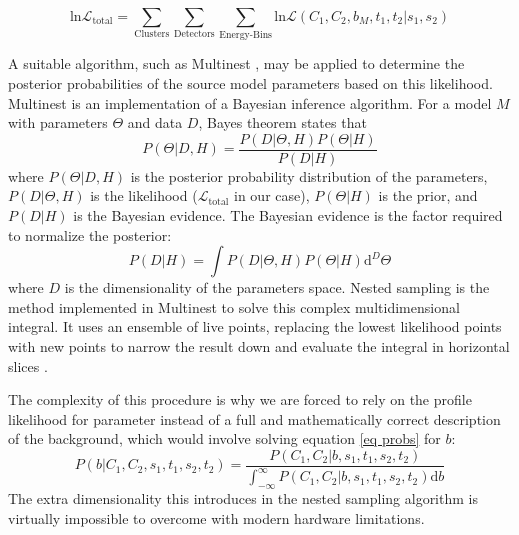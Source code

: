 \documentclass{report}
\begin{document}
\begin{equation} \label{total log likelihood}
  \text{ln}\mathcal{L}_{\text{total}} = \sum_{\text{Clusters}}\sum_{\text{Detectors}}\sum_{\text{Energy-Bins}} \text{ln}\mathcal{L}(C_1, C_2, b_M, t_1, t_2 \vert s_1, s_2)
\end{equation}

A suitable algorithm, such as Multinest \cite{Feroz_2019}, may be applied to determine the posterior probabilities of the source model parameters based on this likelihood.
Multinest is an implementation of a Bayesian inference algorithm. For a model $M$ with parameters $\Theta$ and data $D$, Bayes theorem states that
\begin{equation}
  P(\Theta\vert D, H) = \frac{P(D\vert \Theta, H)P(\Theta\vert H)}{P(D\vert H)}
\end{equation}
where $P(\Theta\vert D, H)$ is the posterior probability distribution of the parameters, $P(D\vert \Theta, H)$ is the likelihood ($\mathcal{L}_{\text{total}}$ in our case), $P(\Theta\vert H)$ is the prior, and $P(D\vert H)$ is the Bayesian evidence. The Bayesian evidence is the factor required to normalize the posterior:
\begin{equation}
  P(D\vert H) = \int P(D\vert \Theta, H) P(\Theta\vert H) \text{d}^D \Theta
\end{equation}
where $D$ is the dimensionality of the parameters space. Nested sampling is the method implemented in Multinest to solve this complex multidimensional integral. It uses an ensemble of live points, replacing the lowest likelihood points with new points to narrow the result down and evaluate the integral in horizontal slices \cite{Feroz_2019}.

The complexity of this procedure is why we are forced to rely on the profile likelihood for parameter instead of a full and mathematically correct description of the background, which would involve solving equation \ref{eq probs} for $b$:
\begin{equation}
  P(b \vert C_1, C_2, s_1, t_1, s_2, t_2) = \frac{P(C_1, C_2 \vert b, s_1, t_1, s_2, t_2)}{\int_{-\infty}^{\infty} P(C_1, C_2 \vert b, s_1, t_1, s_2, t_2) \text{d}b}
\end{equation}
The extra dimensionality this introduces in the nested sampling algorithm is virtually impossible to overcome with modern hardware limitations.
\end{document}
